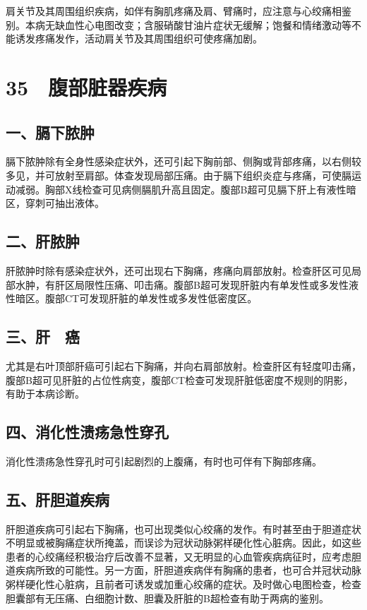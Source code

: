 肩关节及其周围组织疾病，如伴有胸肌疼痛及肩、臂痛时，应注意与心绞痛相鉴别。本病无缺血性心电图改变；含服硝酸甘油片症状无缓解；饱餐和情绪激动等不能诱发疼痛发作，活动肩关节及其周围组织可使疼痛加剧。

\protect\hypertarget{text00100.html}{}{}

\section{35　腹部脏器疾病}

\subsection{一、膈下脓肿}

膈下脓肿除有全身性感染症状外，还可引起下胸前部、侧胸或背部疼痛，以右侧较多见，并可放射至肩部。体查发现局部压痛。由于膈下组织炎症与疼痛，可使膈运动减弱。胸部X线检查可见病侧膈肌升高且固定。腹部B超可见膈下肝上有液性暗区，穿刺可抽出液体。

\subsection{二、肝脓肿}

肝脓肿时除有感染症状外，还可出现右下胸痛，疼痛向肩部放射。检查肝区可见局部水肿，有肝区局限性压痛、叩击痛。腹部B超可发现肝脏内有单发性或多发性液性暗区。腹部CT可发现肝脏的单发性或多发性低密度区。

\subsection{三、肝　癌}

尤其是右叶顶部肝癌可引起右下胸痛，并向右肩部放射。检查肝区有轻度叩击痛，腹部B超可见肝脏的占位性病变，腹部CT检查可发现肝脏低密度不规则的阴影，有助于本病诊断。

\subsection{四、消化性溃疡急性穿孔}

消化性溃疡急性穿孔时可引起剧烈的上腹痛，有时也可伴有下胸部疼痛。

\subsection{五、肝胆道疾病}

肝胆道疾病可引起右下胸痛，也可出现类似心绞痛的发作。有时甚至由于胆道症状不明显或被胸痛症状所掩盖，而误诊为冠状动脉粥样硬化性心脏病。因此，如这些患者的心绞痛经积极治疗后改善不显著，又无明显的心血管疾病病征时，应考虑胆道疾病所致的可能性。另一方面，肝胆道疾病伴有胸痛的患者，也可合并冠状动脉粥样硬化性心脏病，且前者可诱发或加重心绞痛的症状。及时做心电图检查，检查胆囊部有无压痛、白细胞计数、胆囊及肝脏的B超检查有助于两病的鉴别。

